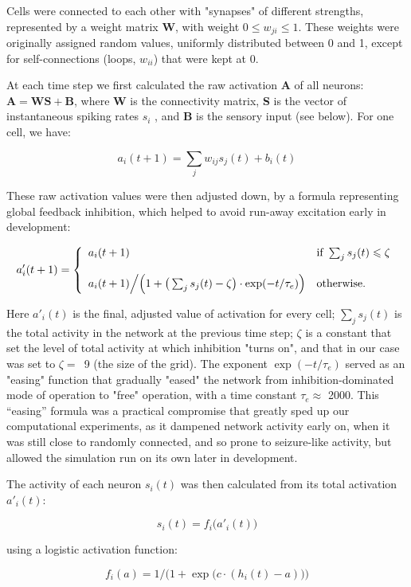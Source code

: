 \documentclass{article}
\begin{document}
Cells were connected to each other with "synapses" of different strengths, represented by a weight matrix \textbf{W}, with weight $0 \leqslant w_{ji} \leqslant 1$. These weights were originally assigned random values, uniformly distributed between 0 and 1, except for self-connections (loops, $w_{ii}$) that were kept at 0.

At each time step we first calculated the raw activation \textbf{A} of all neurons: $\textbf{A} = \textbf{WS} + \textbf{B}$, where \textbf{W} is the connectivity matrix, \textbf{S} is the vector of instantaneous spiking rates $s_i$ , and \textbf{B} is the sensory input (see below). For one cell, we have:

\[ a_i(t+1) = \sum_j{w_{ij}s_j(t)} + b_i(t) \]

These raw activation values were then adjusted down, by a formula representing global feedback inhibition, which helped to avoid run-away excitation early in development:

\[ a'_i(t+1) = \left \{ \begin{array}{l l} a_i(t+1)
& \text{if } \sum_j{s_j(t)} \leqslant \zeta \\ 
 & \\
a_i(t+1)\Big/ \Big(1 + \big(\sum_j{s_j(t)} - \zeta\big) \cdot \exp(- t/\tau_e)\Big) 
& \text{otherwise.} \end{array} \right. \]

Here $a'_i(t)$ is the final, adjusted value of activation for every cell; $\sum_j{s_j(t)}$ is the total activity in the network at the previous time step; $\zeta$ is a constant that set the level of total activity at which inhibition "turns on", and that in our case was set to \mbox{$\zeta=$ 9} (the size of the grid). The exponent $\exp(-t/\tau_e)$ served as an "easing" function that gradually "eased" the network from inhibition-dominated mode of operation to "free" operation, with a time constant $\tau_e\approx$ 2000. This “easing” formula was a practical compromise that greatly sped up our computational experiments, as it dampened network activity early on, when it was still close to randomly connected, and so prone to seizure-like activity, but allowed the simulation run on its own later in development.

The activity of each neuron $s_i(t)$ was then calculated from its total activation $a'_i(t)$:

\[ s_i(t) = f_i\big(a'_i(t)\big) \]

using a logistic activation function: 

\[ f_i(a) = 1/\Big(1+\exp\big(c\cdot(h_i(t)-a)\big)\Big) \]
\end{document}

